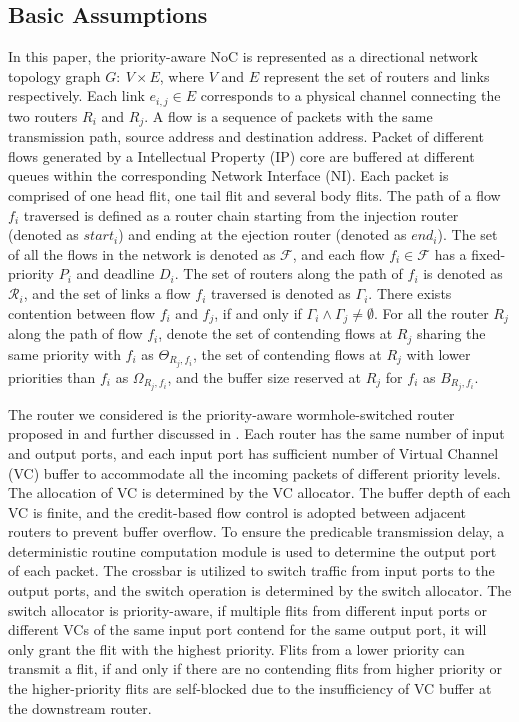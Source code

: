 \documentclass[preprint]{elsarticle}
\begin{document}
\subsection{Basic Assumptions}
In this paper, the priority-aware NoC is represented as a directional network topology graph $G:\ V\times E$, where $V$ and $E$ represent the set of routers and links respectively. Each link $e_{i,j}\in E$ corresponds to a physical channel connecting the two routers $R_i$ and $R_j$. A flow is a sequence of packets with the same transmission path, source address and destination address. Packet of different flows generated by a Intellectual Property (IP) core are buffered at different queues within the corresponding Network Interface (NI). Each packet is comprised of one head flit, one tail flit and several body flits. The path of a flow $f_i$ traversed is defined as a router chain starting from the injection router (denoted as $start_i$) and ending at the ejection router (denoted as $end_i$). The set of all the flows in the network is denoted as $\mathcal{F}$, and each flow $f_i\in\mathcal{F}$ has a fixed-priority $P_i$ and deadline $D_i$. The set of routers along the path of $f_i$ is denoted as $\mathcal{R}_i$, and the set of links a flow $f_i$ traversed is denoted as $\Gamma_i$. There exists contention between flow $f_i$ and $f_j$, if and only if $\Gamma_i\wedge\Gamma_j\neq\emptyset$. For all the router $R_j$ along the path of flow $f_i$, denote the set of contending flows at $R_j$ sharing the same priority with $f_i$ as $\Theta_{R_j,f_i}$, the set of contending flows at $R_j$ with lower priorities than $f_i$ as $\Omega_{R_j,f_i}$, and the buffer size reserved at $R_j$ for $f_i$ as $B_{R_j,f_i}$.

The router we considered is the priority-aware wormhole-switched router proposed in \cite{Shi:2008:RCA:1397757.1397996} and further discussed in \cite{627905}\cite{707545}\cite{73}. Each router has the same number of input and output ports, and each input port has sufficient number of Virtual Channel (VC) buffer to accommodate all the incoming packets of different priority levels. The allocation of VC is determined by the VC allocator. The buffer depth of each VC is finite, and the credit-based flow control \cite{DaTo04} is adopted between adjacent routers to prevent buffer overflow. To ensure the predicable transmission delay, a deterministic routine computation module is used to determine the output port of each packet. The crossbar is utilized to switch traffic from input ports to the output ports, and the switch operation is determined by the switch allocator. The switch allocator is priority-aware, if multiple flits from different input ports or different VCs of the same input port contend for the same output port, it will only grant the flit with the highest priority. Flits from a lower priority can transmit a flit, if and only if there are no contending flits from higher priority or the higher-priority flits are self-blocked due to the insufficiency of VC buffer at the downstream router.
\end{document}
